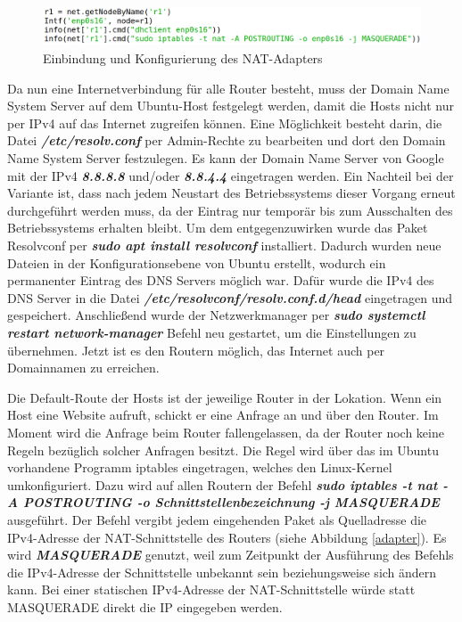 \documentclass[fontsize=12pt,paper=a4,open=any,parskip=half,
  twoside=false,toc=listof,toc=bibliography,fleqn,leqno,
  captions=nooneline,captions=tableabove,british]{scrbook}
\begin{document}
\begin{figure}[H]
 \centering
 \includegraphics[width=1.0\textwidth]{Bilder/interface}
 \captionsetup{justification=centering,margin=2cm}
 \caption{Einbindung und Konfigurierung des NAT-Adapters}
 \label{interface}
\end{figure}

Da nun eine Internetverbindung für alle Router besteht, muss der Domain Name System Server auf dem Ubuntu-Host festgelegt werden, damit die Hosts nicht nur per IPv4 auf das Internet zugreifen können. Eine Möglichkeit besteht darin, die Datei \textit{\textbf{/etc/resolv.conf}} per Admin-Rechte zu bearbeiten und dort den Domain Name System Server festzulegen. Es kann der Domain Name Server von Google mit der IPv4 \textit{\textbf{8.8.8.8}} und/oder \textit{\textbf{8.8.4.4}} eingetragen werden. Ein Nachteil bei der Variante ist, dass nach jedem Neustart des Betriebssystems dieser Vorgang erneut durchgeführt werden muss, da der Eintrag nur temporär bis zum Ausschalten des Betriebssystems erhalten bleibt. Um dem entgegenzuwirken wurde das Paket Resolvconf per \textit{\textbf{sudo apt install resolvconf}} installiert. Dadurch wurden neue Dateien in der Konfigurationsebene von Ubuntu erstellt, wodurch ein permanenter Eintrag des DNS Servers möglich war. Dafür wurde die IPv4 des DNS Server in die Datei \textit{\textbf{/etc/resolvconf/resolv.conf.d/head}} eingetragen und gespeichert. Anschließend wurde der Netzwerkmanager per \textit{\textbf{sudo systemctl restart network-manager}} Befehl neu gestartet, um die Einstellungen zu übernehmen. Jetzt ist es den Routern möglich, das Internet auch per Domainnamen zu erreichen.

Die Default-Route der Hosts ist der jeweilige Router in der Lokation. Wenn ein Host eine Website aufruft, schickt er eine Anfrage an und über den Router. Im Moment wird die Anfrage beim Router fallengelassen, da der Router noch keine Regeln bezüglich solcher Anfragen besitzt. Die Regel wird über das im Ubuntu vorhandene Programm iptables eingetragen, welches den Linux-Kernel umkonfiguriert. Dazu wird auf allen Routern der Befehl \textit{\textbf{sudo iptables -t nat -A POSTROUTING -o Schnittstellenbezeichnung -j MASQUERADE}} ausgeführt. Der Befehl vergibt jedem eingehenden Paket als Quelladresse die IPv4-Adresse der NAT-Schnittstelle des Routers (siehe Abbildung \ref{adapter}). Es wird \textit{\textbf{MASQUERADE}} genutzt, weil zum Zeitpunkt der Ausführung des Befehls die IPv4-Adresse der Schnittstelle unbekannt sein beziehungsweise sich ändern kann. Bei einer statischen IPv4-Adresse der NAT-Schnittstelle würde statt MASQUERADE direkt die IP eingegeben werden.
\end{document}
